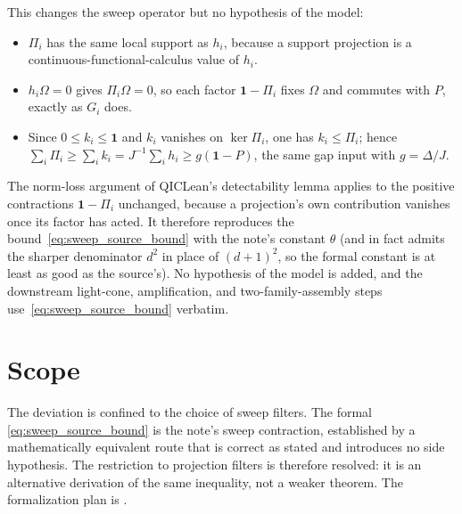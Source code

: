 \documentclass{article}
\begin{document}
This changes the sweep operator but no hypothesis of the model:
\begin{itemize}
    \item $\Pi_i$ has the same local support as $h_i$, because a support
          projection is a continuous-functional-calculus value of $h_i$.
    \item $h_i\Omega=0$ gives $\Pi_i\Omega=0$, so each factor $\mathbf 1-\Pi_i$
          fixes $\Omega$ and commutes with $P$, exactly as $G_i$ does.
    \item Since $0\le k_i\le\mathbf 1$ and $k_i$ vanishes on $\ker\Pi_i$, one
          has $k_i\le\Pi_i$; hence
          $\sum_i\Pi_i\ge\sum_i k_i=J^{-1}\sum_i h_i\ge g(\mathbf 1-P)$, the same
          gap input with $g=\Delta/J$.
\end{itemize}
The norm-loss argument of QICLean's detectability lemma applies to the
positive contractions $\mathbf 1-\Pi_i$ unchanged, because a projection's own
contribution vanishes once its factor has acted. It therefore reproduces the
bound~\eqref{eq:sweep_source_bound} with the note's constant $\theta$ (and in
fact admits the sharper denominator $d^2$ in place of $(d+1)^2$, so the formal
constant is at least as good as the source's). No hypothesis of the model is
added, and the downstream light-cone, amplification, and two-family-assembly
steps use~\eqref{eq:sweep_source_bound} verbatim.

\section{Scope}

The deviation is confined to the choice of sweep filters. The formal
\eqref{eq:sweep_source_bound} is the note's sweep contraction, established by a
mathematically equivalent route that is correct as stated and introduces no
side hypothesis. The restriction to projection filters is therefore resolved:
it is an alternative derivation of the same inequality, not a weaker theorem.
The formalization plan is .



\end{document}
